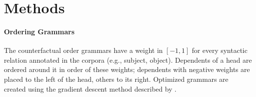 \documentclass[11pt,a4paper]{article}
\begin{document}

\section*{Methods}





\paragraph{Ordering Grammars}

The counterfactual order grammars have a weight in $[-1, 1]$ for every syntactic relation annotated in the corpora (e.g., subject, object).
Dependents of a head are ordered around it in order of these weights; dependents with negative weights are placed to the left of the head, others to its right.
Optimized grammars are created using the gradient descent method described by \citep{hahn2020universals}.





\end{document}

